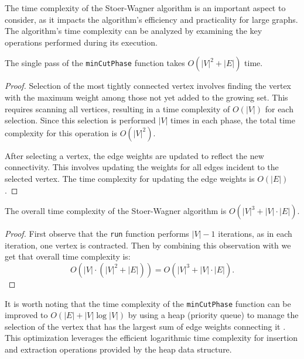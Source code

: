 The time complexity of the Stoer-Wagner algorithm is an important aspect to consider, as it impacts the algorithm's efficiency and practicality for large graphs. The algorithm's time complexity can be analyzed by examining the key operations performed during its execution.

\begin{lemma}
    \label{lemma:stoer_2}
    The single pass of the \texttt{minCutPhase} function takes \( O(|V|^2 + |E|) \) time.
\end{lemma}

\begin{proof}
    Selection of the most tightly connected vertex involves finding the vertex with the maximum weight among those not yet added to the growing set. This requires scanning all vertices, resulting in a time complexity of \( O(|V|) \) for each selection. Since this selection is performed \( |V| \) times in each phase, the total time complexity for this operation is \( O(|V|^2) \).
    
    After selecting a vertex, the edge weights are updated to reflect the new connectivity. This involves updating the weights for all edges incident to the selected vertex. The time complexity for updating the edge weights is \( O(|E|) \).
\end{proof}

\begin{lemma}
    The overall time complexity of the Stoer-Wagner algorithm is \(O(|V|^3 + |V| \cdot |E|).\)
\end{lemma}

\begin{proof}
    First observe that the \texttt{run} function performs \( |V|-1 \) iterations, as in each iteration, one vertex is contracted. Then by combining this observation with  we get that overall time complexity is:
    \[
    O(|V| \cdot (|V|^2 + |E|)) = O(|V|^3 + |V| \cdot |E|).
    \]
\end{proof}


It is worth noting that the time complexity of the \texttt{minCutPhase} function can be improved to \( O(|E| + |V| \log |V|) \) by using a heap (priority queue) to manage the selection of the vertex that has the largest sum of edge weights connecting it \cite{stoer1997simple}. This optimization leverages the efficient logarithmic time complexity for insertion and extraction operations provided by the heap data structure.